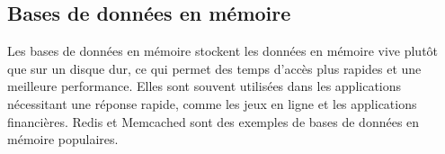 \subsection{Bases de données en mémoire}\label{subsec:in-memory-databases}
Les bases de données en mémoire stockent les données en mémoire vive plutôt que sur un disque dur, ce qui permet des temps d'accès plus rapides et une meilleure performance. Elles sont souvent utilisées dans les applications nécessitant une réponse rapide, comme les jeux en ligne et les applications financières. Redis et Memcached sont des exemples de bases de données en mémoire populaires.